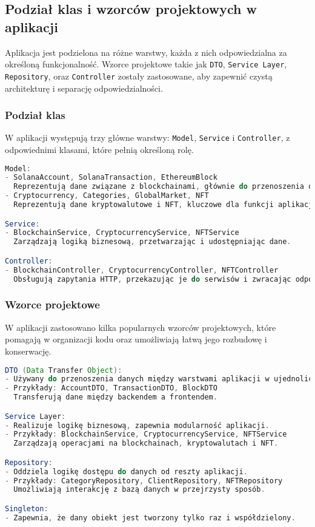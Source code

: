 \subsection{Podział klas i wzorców projektowych w aplikacji}

Aplikacja jest podzielona na różne warstwy, każda z nich odpowiedzialna za określoną funkcjonalność. Wzorce projektowe takie jak \texttt{DTO}, \texttt{Service Layer}, \texttt{Repository}, oraz \texttt{Controller} zostały zastosowane, aby zapewnić czystą architekturę i separację odpowiedzialności.

\subsubsection{Podział klas}

W aplikacji występują trzy główne warstwy: \texttt{Model}, \texttt{Service} i \texttt{Controller}, z odpowiednimi klasami, które pełnią określoną rolę.

\begin{lstlisting}[language=Java, caption={Podział klas w aplikacji}]
Model:
- SolanaAccount, SolanaTransaction, EthereumBlock
  Reprezentują dane związane z blockchainami, głównie do przenoszenia danych.
- Cryptocurrency, Categories, GlobalMarket, NFT
  Reprezentują dane kryptowalutowe i NFT, kluczowe dla funkcji aplikacji.

Service:
- BlockchainService, CryptocurrencyService, NFTService
  Zarządzają logiką biznesową, przetwarzając i udostępniając dane.

Controller:
- BlockchainController, CryptocurrencyController, NFTController
  Obsługują zapytania HTTP, przekazując je do serwisów i zwracając odpowiedzi.
\end{lstlisting}


\subsubsection{Wzorce projektowe}

W aplikacji zastosowano kilka popularnych wzorców projektowych, które pomagają w organizacji kodu oraz umożliwiają łatwą jego rozbudowę i konserwację.

\begin{lstlisting}[language=Java, caption={Wzorce projektowe w aplikacji}]
DTO (Data Transfer Object):
- Używany do przenoszenia danych między warstwami aplikacji w ujednoliconej formie.
- Przykłady: AccountDTO, TransactionDTO, BlockDTO
  Transferują dane między backendem a frontendem.

Service Layer:
- Realizuje logikę biznesową, zapewnia modularność aplikacji.
- Przykłady: BlockchainService, CryptocurrencyService, NFTService
  Zarządzają operacjami na blockchainach, kryptowalutach i NFT.

Repository:
- Oddziela logikę dostępu do danych od reszty aplikacji.
- Przykłady: CategoryRepository, ClientRepository, NFTRepository
  Umożliwiają interakcję z bazą danych w przejrzysty sposób.

Singleton:
- Zapewnia, że dany obiekt jest tworzony tylko raz i współdzielony.
\end{lstlisting}


